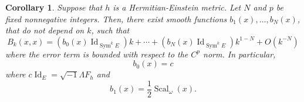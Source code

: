 \documentclass{amsart}
\newtheorem{cor}[thm]{Corollary}
\theoremstyle{definition}
\theoremstyle{remark}
\numberwithin{equation}{section}
\DeclareMathOperator{\Sym}{Sym}
\DeclareMathOperator{\Id}{Id}
\DeclareMathOperator{\Scal}{Scal}
\begin{document}
\begin{cor} \label{cor: HE}
Suppose that $h$ is a Hermitian-Einstein metric. Let $N$ and $p$ be fixed nonnegative integers. Then, there exist smooth functions $b_{1}(x), \dotsc, b_N(x)$, that do not depend on $k$, such that
\begin{equation*}
    B_k(x,x) = \left ( b_{0}(x) \Id_{\Sym^k E}\right )k + \dotsb + \left ( b_{N}(x) \Id_{\Sym^k E} \right ) k^{1-N} + O(k^{-N})
\end{equation*}
where the error term is bounded with respect to the $C^p$ norm. In particular,
\begin{equation*}
b_{0}(x) = c
\end{equation*}
where $c\Id_E = \sqrt{-1} \Lambda F_h$ and 
\begin{equation*}
b_{1}(x) = \frac{1}{2}\Scal_\omega(x).
\end{equation*}
\end{cor}
\end{document}
